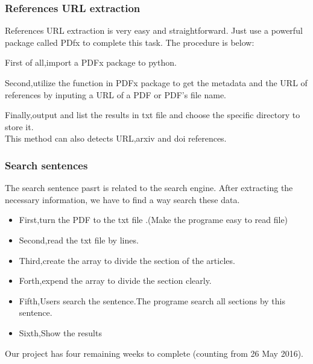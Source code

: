 \subsubsection*{References URL extraction}
References URL extraction is very easy and straightforward. Just use a powerful package called PDfx to complete this task.
The procedure is below:
   \item  First of all,import a PDFx package to python.\\
   \item  Second,utilize the function in PDFx package to get the metadata and the URL of references by inputing a URL of a PDF or PDF's file name. \\
   \item  Finally,output and list the results in txt file and choose the specific directory to store it. \\
   
   This method can also detects URL,arxiv and doi references.




\subsubsection*{Search sentences}
The search sentence pasrt is  related to the search engine. After extracting the necessary information, we have to find a  way search these data.
\begin{itemize}
	\item First,turn the PDF to the txt file .(Make the programe easy to read file)\\ 
	\item Second,read the txt file by lines.\\ 	
	\item Third,create the array to divide the section of the articles.\\ 	
	\item Forth,expend the array to divide the section clearly.\\ 	
	\item Fifth,Users search the sentence.The programe search all sections by this sentence.\\
	\item Sixth,Show the results\\  		
	
\end{itemize}
Our project has four remaining weeks to complete (counting from 26 May 2016). 

\newpage %